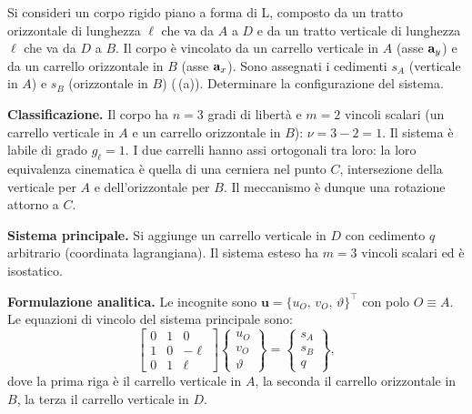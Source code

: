 \begin{esempio}
	\label{ex:labile_L}
	Si consideri un corpo rigido piano a forma di L,
	composto da un tratto orizzontale di lunghezza $\ell$
	che va da $A$ a $D$ e da un tratto verticale di
	lunghezza $\ell$ che va da $D$ a $B$. Il corpo è
	vincolato da un carrello verticale in $A$ (asse $\mathbf{a}_y$)
	e da un carrello orizzontale in $B$ (asse $\mathbf{a}_x$).
	Sono assegnati i cedimenti $s_A$ (verticale in $A$) e
	$s_B$ (orizzontale in $B$)
	(\,(a)). Determinare la
	configurazione del sistema.
	



	
	\begin{svolgimento}
		
		\noindent\textbf{Classificazione.}
		Il corpo ha $n = 3$ gradi di libertà e $m = 2$ vincoli
		scalari (un carrello verticale in $A$ e un carrello
		orizzontale in $B$): $\nu = 3 - 2 = 1$. Il sistema è
		labile di grado $g_\ell = 1$. 		
		I due carrelli hanno assi ortogonali tra loro: la loro
		equivalenza cinematica è quella di una cerniera nel
		punto $C$, intersezione della verticale per $A$ e
		dell'orizzontale per $B$. Il meccanismo è dunque una
		rotazione attorno a $C$.
		
		\noindent\textbf{Sistema principale.}
		Si aggiunge un carrello verticale in $D$ con cedimento
		$q$ arbitrario (coordinata lagrangiana). Il sistema
		esteso ha $m = 3$ vincoli scalari ed è isostatico.
		
		\noindent\textbf{Formulazione analitica.}
		Le incognite sono $\bm{u} = \{u_O,\, v_O,\,
		\vartheta\}^\top$ con polo $O \equiv A$. Le equazioni
		di vincolo del sistema principale sono:
		\begin{equation*}
			\begin{bmatrix}
				0 & 1 &  0 \\
				1 & 0 & -\ell \\
				0 & 1 &  \ell
			\end{bmatrix}
			\begin{Bmatrix}
				u_O \\ v_O \\ \vartheta
			\end{Bmatrix}
			=
			\begin{Bmatrix}
				s_A \\ s_B \\ q
			\end{Bmatrix},
		\end{equation*}
		dove la prima riga è il carrello verticale in $A$,
		la seconda il carrello orizzontale in $B$, la terza
		il carrello verticale in $D$.
		

\end{svolgimento}
\end{esempio}
